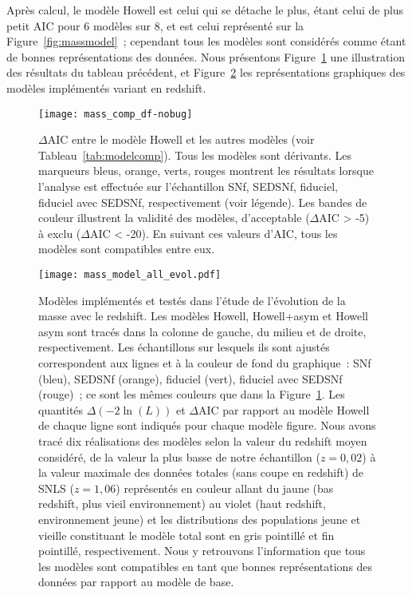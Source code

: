 \documentclass[../main/main.tex]{subfiles}
\begin{document}
Après calcul, le modèle Howell est celui qui se détache le plus, étant celui de
plus petit AIC pour 6 modèles sur 8, et est celui représenté sur la
Figure~\ref{fig:massmodel}~; cependant tous les modèles sont considérés comme
étant de bonnes représentations des données. Nous présentons
Figure~\ref{fig:mod_comp} une illustration des résultats du tableau précédent,
et Figure~\ref{fig:mod_all} les représentations graphiques des modèles
implémentés variant en redshift.

\begin{figure}[ht]
    \centering
    \texttt{[image: mass\_comp\_df-nobug]}
    \caption[$\Delta$AIC entre le modèle Howell et les autres
    modèles]{$\Delta$AIC entre le modèle Howell et les autres modèles (voir
        Tableau~\ref{tab:modelcomp}). Tous les modèles sont dérivants. Les
        marqueurs bleus, orange, verts, rouges montrent les résultats lorsque
        l'analyse est effectuée sur l'échantillon SNf, SEDSNf, fiduciel,
        fiduciel avec SEDSNf, respectivement (voir légende). Les bandes de
        couleur illustrent la validité des modèles, d'acceptable ($\Delta$AIC >
        -5) à exclu ($\Delta$AIC < -20). En suivant ces valeurs d'AIC, tous les
        modèles sont compatibles entre eux.}
    \label{fig:mod_comp}
\end{figure}

\begin{figure}[htbp]
    \vspace*{-3cm}
    \centerfloat
    \texttt{[image: mass\_model\_all\_evol.pdf]}
    \caption[Modèles implémentés et testés dans l'étude de l'évolution de
    l'étirement avec le redshift]{\scriptsize Modèles implémentés et testés dans
        l'étude de l'évolution de la masse avec le redshift. Les modèles Howell,
        Howell+asym et Howell asym sont tracés dans la colonne de gauche, du
        milieu et de droite, respectivement. Les échantillons sur lesquels ils
        sont ajustés correspondent aux lignes et à la couleur de fond du
        graphique~: SNf (bleu), SEDSNf (orange), fiduciel (vert), fiduciel avec
        SEDSNf (rouge)~; ce sont les mêmes couleurs que dans la
        Figure~\ref{fig:mod_comp}. Les quantités $\Delta(-2\ln(L))$ et
        $\Delta$AIC par rapport au modèle Howell de chaque ligne sont indiqués
        pour chaque modèle figure. Nous avons tracé dix réalisations des modèles
        selon la valeur du redshift moyen considéré, de la valeur la plus basse
        de notre échantillon ($z = 0,02$) à la valeur maximale des données
        totales (sans coupe en redshift) de SNLS ($z = 1,06$) représentés en
        couleur allant du jaune (bas redshift, plus vieil environnement) au
        violet (haut redshift, environnement jeune) et les distributions des
        populations jeune et vieille constituant le modèle total sont en gris
        pointillé et fin pointillé, respectivement. Nous y retrouvons
        l'information que tous les modèles sont compatibles en tant que bonnes
    représentations des données par rapport au modèle de base.}
    \label{fig:mod_all}
\end{figure}
\end{document}
